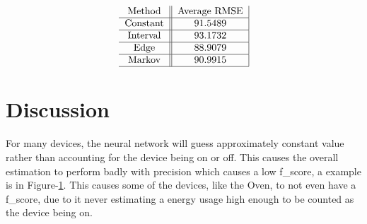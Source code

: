\documentclass{article}
\begin{document}
\begin{table*}[t]
	\centering
	
$$\begin{tabular}{c||c|}
Method & Average RMSE\\
\hline
Constant & 91.5489\\
\hline
Interval & 93.1732 \\
\hline
Edge & 88.9079 \\
\hline
Markov & 90.9915 \\
\hline
\end{tabular}$$
 \label{tab:PreprocessVsRawRMSE}
\end{table*}


\section{Discussion} \label{sec:Discussion}

For many devices, the neural network will guess approximately constant value rather than accounting for the device being on or off.
This causes the overall estimation to perform badly with precision which causes a low f\_score, a example is in Figure-\ref{fig:KitchenOutlets}.
This causes some of the devices, like the Oven, to not even have a f\_score, due to it never estimating a energy usage high enough to be counted as the device being on.

\begin{figure}


  \label{fig:KitchenOutlets}
\end{figure}
\end{document}
